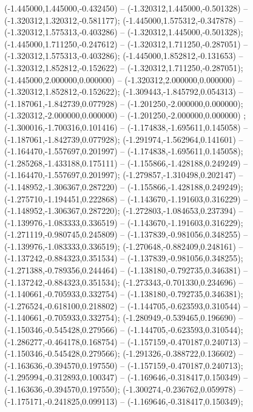  (-1.445000,1.445000,-0.432450) -- (-1.320312,1.445000,-0.501328) -- (-1.320312,1.320312,-0.581177);
 (-1.445000,1.575312,-0.347878) -- (-1.320312,1.575313,-0.403286) -- (-1.320312,1.445000,-0.501328);
 (-1.445000,1.711250,-0.247612) -- (-1.320312,1.711250,-0.287051) -- (-1.320312,1.575313,-0.403286);
 (-1.445000,1.852812,-0.131653) -- (-1.320312,1.852812,-0.152622) -- (-1.320312,1.711250,-0.287051);
 (-1.445000,2.000000,0.000000) -- (-1.320312,2.000000,0.000000) -- (-1.320312,1.852812,-0.152622);
 (-1.309443,-1.845792,0.054313) -- (-1.187061,-1.842739,0.077928) -- (-1.201250,-2.000000,0.000000);
 (-1.320312,-2.000000,0.000000) -- (-1.201250,-2.000000,0.000000) ;
 (-1.300016,-1.700316,0.101416) -- (-1.174838,-1.695611,0.145058) -- (-1.187061,-1.842739,0.077928);
 (-1.291974,-1.562964,0.141601) -- (-1.164470,-1.557697,0.201997) -- (-1.174838,-1.695611,0.145058);
 (-1.285268,-1.433188,0.175111) -- (-1.155866,-1.428188,0.249249) -- (-1.164470,-1.557697,0.201997);
 (-1.279857,-1.310498,0.202147) -- (-1.148952,-1.306367,0.287220) -- (-1.155866,-1.428188,0.249249);
 (-1.275710,-1.194451,0.222868) -- (-1.143670,-1.191603,0.316229) -- (-1.148952,-1.306367,0.287220);
 (-1.272803,-1.084653,0.237394) -- (-1.139976,-1.083333,0.336519) -- (-1.143670,-1.191603,0.316229);
 (-1.271119,-0.980745,0.245809) -- (-1.137839,-0.981056,0.348255) -- (-1.139976,-1.083333,0.336519);
 (-1.270648,-0.882409,0.248161) -- (-1.137242,-0.884323,0.351534) -- (-1.137839,-0.981056,0.348255);
 (-1.271388,-0.789356,0.244464) -- (-1.138180,-0.792735,0.346381) -- (-1.137242,-0.884323,0.351534);
 (-1.273343,-0.701330,0.234696) -- (-1.140661,-0.705933,0.332754) -- (-1.138180,-0.792735,0.346381);
 (-1.276524,-0.618100,0.218802) -- (-1.144705,-0.623593,0.310544) -- (-1.140661,-0.705933,0.332754);
 (-1.280949,-0.539465,0.196690) -- (-1.150346,-0.545428,0.279566) -- (-1.144705,-0.623593,0.310544);
 (-1.286277,-0.464178,0.168754) -- (-1.157159,-0.470187,0.240713) -- (-1.150346,-0.545428,0.279566);
 (-1.291326,-0.388722,0.136602) -- (-1.163636,-0.394570,0.197550) -- (-1.157159,-0.470187,0.240713);
 (-1.295994,-0.312893,0.100347) -- (-1.169646,-0.318417,0.150349) -- (-1.163636,-0.394570,0.197550);
 (-1.300274,-0.236762,0.059978) -- (-1.175171,-0.241825,0.099113) -- (-1.169646,-0.318417,0.150349);
